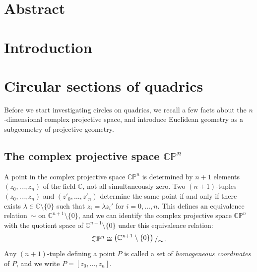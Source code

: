 \documentclass[10pt, a4paper]{article}
\newcommand{\bigslant}[2]{{\raisebox{.2em}{$#1$}\left/\raisebox{-.2em}{$#2$}\right.}}
\theoremstyle{BoldTopSpacing}
\theoremstyle{BoldTopSpacing}
\theoremstyle{BoldTopSpacing}
\theoremstyle{BoldTopBottomSpacing}
\theoremstyle{BoldTopSpacing}
\theoremstyle{BoldTopBottomSpacing}
\theoremstyle{remark}
\begin{document}
\pagestyle{fancy}
\section*{Abstract}
\label{sec:abstract}

\pagebreak
\pagestyle{tocstyle}
\renewcommand{\contentsname}{Contents}
\tableofcontents
\pagebreak
\listoffigures
\pagebreak
\pagestyle{fancy}
\section{Introduction}
\label{sec:introduction}
\pagebreak
\section{Circular sections of quadrics}
\label{sec:circular-sections-of-quadrics}

Before we start investigating circles on quadrics, we recall a few facts about the $n$-dimensional complex projective space, and introduce Euclidean geometry as a subgeometry of projective geometry. \par

\subsection{The complex projective space $\mathbb{C}\mathbb{P}^n$}
\label{subsec:complex-projective-space}

A point in the complex projective space $\mathbb{C}\mathbb{P}^{n}$ is determined by $n + 1$ elements $(z_{0}, \dots, z_{n})$ of the field $\mathbb{C}$, not all simultaneously zero. Two $(n + 1)$-tuples $(z_{0}, \dots, z_{n})$ and $(z'_{0}, \dots, z'_{n})$ determine the same point if and only if there exists $\lambda \in \mathbb{C} \setminus \{ 0 \}$ such that $z_{i} = \lambda z_{i}'$ for $i = 0, \dots, n$. This defines an equivalence relation~$\sim$ on $\mathbb{C}^{n + 1} \setminus \{ 0 \}$, and we can identify the complex projective space $\mathbb{C}\mathbb{P}^n$ with the quotient space of $\mathbb{C}^{n + 1} \setminus \{ 0 \}$ under this equivalence relation:
\[
    \mathbb{C}\mathbb{P}^n \cong \bigslant{\left( \mathbb{C}^{n + 1} \setminus \{ 0 \} \right)}{\sim}.
\]
Any $(n+1)$-tuple defining a point $P$ is called a set of \textit{homogeneous coordinates} of $P$, and we write $P = [z_{0},\dots, z_{n}]$.\par
\end{document}
